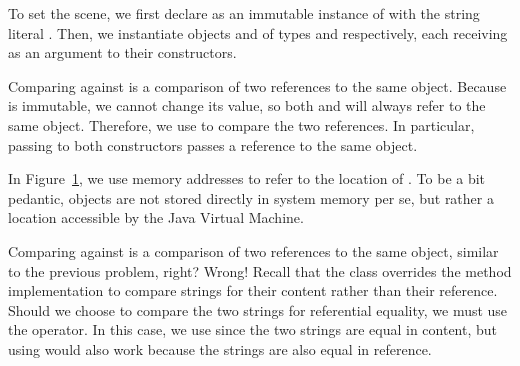 To set the scene, we first declare  as an immutable instance of  with the string literal . 
Then, we instantiate objects  and  of types  and  respectively, each receiving  as an argument to their constructors. 

Comparing  against  is a comparison of two references to the same object. 
Because  is immutable, we cannot change its value, so both  and  will always refer to the same object. 
Therefore, we use  to compare the two references. 
In particular, passing  to both constructors passes a reference to the same object.

\begin{figure}[htp!]
\centering
{}
\label{fig:memoryref}
\end{figure}

In Figure~\ref{fig:memoryref}, we use memory addresses to refer to the location of . To be a bit pedantic, objects are not stored directly in system memory per se, but rather a location accessible by the Java Virtual Machine.

Comparing  against  is a comparison of two references to the same object, similar to the previous problem, right? Wrong! Recall that the  class overrides the  method implementation to compare strings for their content rather than their reference. Should we choose to compare the two strings for referential equality, we must use the \ttt{==} operator. In this case, we use  since the two strings are equal in content, but using \ttt{==} would also work because the strings are also equal in reference.

